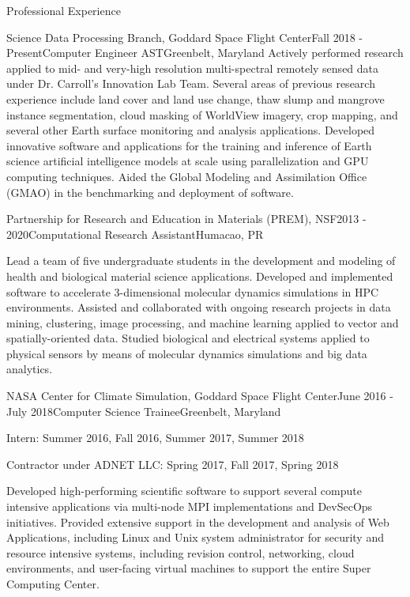 \documentclass{resume} %
\begin{document}
\begin{rSection}{Professional Experience}

\begin{rSubsection}{Science Data Processing Branch, Goddard Space Flight Center}{Fall 2018 - Present}{Computer Engineer AST}{Greenbelt, Maryland}
Actively performed research applied to mid- and very-high resolution multi-spectral remotely sensed data under Dr. Carroll's Innovation Lab Team.  Several areas of previous research experience include land cover and land use change, thaw slump and mangrove instance segmentation, cloud masking of WorldView imagery, crop mapping, and several other Earth surface monitoring and analysis applications.  Developed innovative software and applications for the training and inference of Earth science artificial intelligence models at scale using parallelization and GPU computing techniques.  Aided the Global Modeling and Assimilation Office (GMAO) in the benchmarking and deployment of software.
\end{rSubsection}


\begin{rSubsection}{Partnership for Research and Education in Materials (PREM), NSF}{2013 - 2020}{Computational Research Assistant}{Humacao, PR}
\item Lead a team of five undergraduate students in the development and modeling of health and biological material science applications. Developed and implemented software to accelerate 3-dimensional molecular dynamics simulations in HPC environments. Assisted and collaborated with ongoing research projects in data mining, clustering, image processing, and machine learning applied to vector and spatially-oriented data. Studied biological and electrical systems applied to physical sensors by means of molecular dynamics simulations and big data analytics.
\end{rSubsection}

\begin{rSubsection}{NASA Center for Climate Simulation, Goddard Space Flight Center}{June 2016 - July 2018}{Computer Science Trainee}{Greenbelt, Maryland}
\item[] Intern: Summer 2016, Fall 2016, Summer 2017, Summer 2018
\item[] Contractor under ADNET LLC: Spring 2017, Fall 2017, Spring 2018
\item Developed high-performing scientific software to support several compute intensive applications via multi-node MPI implementations and DevSecOps initiatives. Provided extensive support in the development and analysis of Web Applications, including Linux and Unix system administrator for security and resource intensive systems, including revision control, networking, cloud environments, and user-facing virtual machines to support the entire Super Computing Center.
\end{rSubsection}
\end{rSection}
\end{document}
